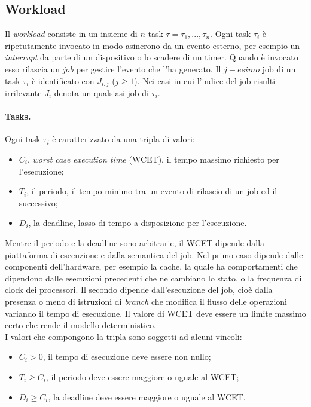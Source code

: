 \subsection{Workload}
\label{sec:overviewWL}

Il \textit{workload} consiste in un insieme di $n$ task $\tau = {\tau_1, ... , \tau_n}$. Ogni task $\tau_i$ è ripetutamente invocato in modo asincrono da un evento esterno, per esempio un \textit{interrupt} da parte di un dispositivo o lo scadere di un timer. Quando è invocato esso rilascia un \textit{job} per gestire l'evento che l'ha generato. Il $j-esimo$ job di un task $\tau_i$ è identificato con $J_{i,j}$ ($j \geq 1$). Nei casi in cui l'indice del job risulti irrilevante $J_i$ denota un qualsiasi job di $\tau_i$.\\

\paragraph{Tasks.} Ogni task $\tau_i$ è caratterizzato da una tripla di valori:\\
\begin{itemize}
	\item $C_i$, \textit{worst case execution time} (WCET), il tempo massimo richiesto per l'esecuzione;
	\item $T_i$, il periodo, il tempo minimo tra un evento di rilascio di un job ed il successivo;
	\item $D_i$, la deadline, lasso di tempo a disposizione per l'esecuzione.\\
\end{itemize}

Mentre il periodo e la deadline sono arbitrarie, il WCET dipende dalla piattaforma di esecuzione e dalla semantica del job. Nel primo caso dipende dalle componenti dell'hardware, per esempio la cache, la quale ha comportamenti che dipendono dalle esecuzioni precedenti che ne cambiano lo stato, o la frequenza di clock dei processori. Il secondo dipende dall'esecuzione del job, cioè dalla presenza o meno di istruzioni di \textit{branch} che modifica il flusso delle operazioni variando il tempo di esecuzione. Il valore di WCET deve essere un limite massimo certo che rende il modello deterministico.\\

I valori che compongono la tripla sono soggetti ad alcuni vincoli:\\

\begin{itemize}
	\item $C_i > 0$, il tempo di esecuzione deve essere non nullo;
	\item $T_i \geq C_i$, il periodo deve essere maggiore o uguale al WCET;
	\item $D_i \geq C_i$, la deadline deve essere maggiore o uguale al WCET.\\
\end{itemize}

